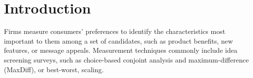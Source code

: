 \documentclass[a4paper,11pt]{article}
\begin{document}
%


\newpage

\section{Introduction}


Firms measure consumers' preferences to identify the characteristics most important to them among a set of candidates, such as product benefits, new features, or message appeals. Measurement techniques commonly include idea screening surveys, such as choice-based conjoint analysis and maximum-difference (MaxDiff), or best-worst, scaling. 
\end{document}
